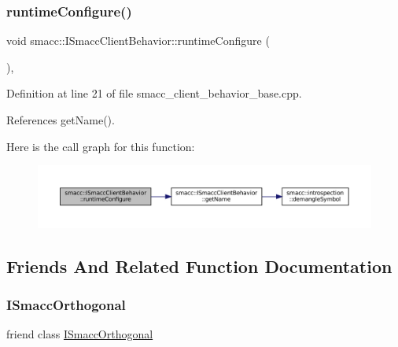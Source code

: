 \subsubsection{\texorpdfstring{runtime\+Configure()}{runtimeConfigure()}}
{\footnotesize\ttfamily void smacc\+::\+I\+Smacc\+Client\+Behavior\+::runtime\+Configure (\begin{DoxyParamCaption}{ }\end{DoxyParamCaption})\hspace{0.3cm}{\ttfamily [protected]}, {\ttfamily [virtual]}}



Definition at line 21 of file smacc\+\_\+client\+\_\+behavior\+\_\+base.\+cpp.



References get\+Name().


Here is the call graph for this function\+:
\nopagebreak
\begin{figure}[H]
\begin{center}
\leavevmode
\includegraphics[width=350pt]{classsmacc_1_1ISmaccClientBehavior_a1078de57f291301cc2829c3548fa5ea5_cgraph}
\end{center}
\end{figure}


\subsection{Friends And Related Function Documentation}
\mbox{\label{classsmacc_1_1ISmaccClientBehavior_a7205cc84a71fea903124d54d01e99a68}} 
\subsubsection{\texorpdfstring{I\+Smacc\+Orthogonal}{ISmaccOrthogonal}}
{\footnotesize\ttfamily friend class \hyperlink{classsmacc_1_1ISmaccOrthogonal}{I\+Smacc\+Orthogonal}\hspace{0.3cm}{\ttfamily [friend]}}



